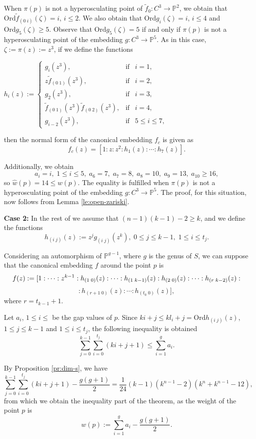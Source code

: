 \documentclass{amsart}
\begin{document}
When $\pi(p)$ is not a hyperosculating point of  $\tilde{f}_0:C^3\rightarrow {\mathbb{P}}^2$, we obtain that  ${\mathrm{Ord}} \tilde{f}_{(0\;i)}(\zeta)=i$, $i\leq 2$. 
 We also obtain that ${\mathrm{Ord}} g_{i}(\zeta)=i$, $i\leq 4$ and  ${\mathrm{Ord}} g_{5}(\zeta)\geq 5$.  
 Observe that ${\mathrm{Ord}} g_{5}(\zeta)=5$ if  and only if $\pi(p)$ is not a hyperosculating point of the embedding $g:C^3\rightarrow {\mathbb{P}}^5$. As in this case, $\zeta:=\pi(z):=z^3$, if we define the functions 
\begin{center}
$h_{i}(z):=\left \{ \begin{array}{ccc} 
g_{i}(z^3), & \mbox{if} & i=1,\\
z\tilde{f}_{(0\;1)}(z^3), & \mbox{if} & i=2,\\
g_2(z^3), & \mbox{if} & i=3,\\
\tilde{f}_{(0\;1)}(z^3)\tilde{f}_{(0\;2)}(z^3), & \mbox{if} & i=4,\\
g_{i-2}(z^3), & \mbox{if} & 5\leq i\leq 7,
\end{array} \right.$
 \end{center}
 then the normal form of the canonical embedding $f_c$ is given as 
 $$f_{c}(z)=[1:z:z^2:h_1(z):\cdots  :h_{7}(z)].$$

 Additionally, we obtain 
 $$a_i=i, \; 1\leq i\leq 5, \; a_6=7,\; a_7=8,\; a_8=10,\; a_9 = 13, \; a_{10} \geq 16,$$
so $\hat{w}(p)=14\leq w(p)$. The equality is fulfilled when $\pi(p)$ is not a hyperosculating point of the embedding $g:C^3\rightarrow {\mathbb{P}}^5$.  The proof, for this situation, now follows from Lemma \ref{le:open-zariski}.

\smallskip
\noindent
{\bf Case 2:}
 In the rest of we assume that $(n-1)(k-1)-2\geq k$, and we define the functions
$$h_{(i\;j)}(z):=z^jg_{(i\;j)}(z^k),\; 0\leq j\leq k-1,\; 1\leq i \leq t_{j}.$$
 

 Considering an automorphism of ${\mathbb{P}}^{g-1}$, where $g$ is the genus of $S$, we can 
 suppose that the canonical embedding $f$ around the point $p$ is
$$\tiny f(z):= [1:\cdots:z^{k-1}: h_{(1\;0)}(z):\cdots:h_{(1\;k-1)}(z):h_{(2\;0)}(z):\cdots:
h_{(r\;k-2)}(z):$$$$:h_{(r+1\;0)}(z): \cdots:h_{(t_0\;0)}(z)],$$
where $r=t_{k-1}+1$.


Let $a_i$, $1\leq i\leq$ be  the gap values of  $p$. Since $ki+j\leq kl_i+j={\mathrm{Ord}} h_{(i\;j)}(z)$, 
$1\leq j \leq k-1$ and $1\leq i\leq t_j$, the following inequality is obtained
$$\sum_{j=0}^{k-1}\sum_{i=0}^{t_{j}}(ki+j+1)\leq \sum_{i=1}^{g}a_{i}.$$

By Proposition \ref{pr:dim-s}, we have
$$\sum_{j=0}^{k-1}\sum_{i=0}^{t_{j}}(ki+j+1)-\frac{g(g+1)}{2}=\frac{1}{24}
(k-1) (k^{n-1}-2) (k^{n} + k^{n-1}-12),$$
from which we obtain the inequality part of the theorem, as the weight of the point $p$ is
$$w(p):=\sum_{i=1}^{g}a_i-\frac{g(g+1)}{2}.$$
\end{document}
